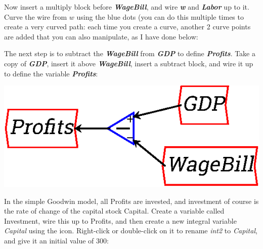 Now insert a multiply block before {\bf\em WageBill}, and wire {\bf\em
w} and {\bf\em Labor} up to it. Curve the wire from $w$ using the blue
dots (you can do this multiple times to create a very curved path:
each time you create a curve, another 2 curve points are added that
you can also manipulate, as I have done below: 

\begin{center}
\end{center}


The next step is to subtract the {\bf\em WageBill} from {\bf\em GDP}
to define {\bf\em Profits}. Take a copy of {\bf\em GDP}, insert it
above {\bf\em WageBill}, insert a subtract block, and wire it up to
define the variable {\bf\em Profits}:

\begin{center}
\includegraphics{images/NewItem100.eps}
\end{center}


In the simple Goodwin model, all Profits are invested, and investment
of course is the rate of change of the capital stock Capital. Create a
variable called Investment, wire this up to Profits, and then create a
new integral variable {\em Capital} using the 
icon. Right-click or double-click on it to rename {\em int2} to {\em
Capital}, and give it an initial value of 300:

